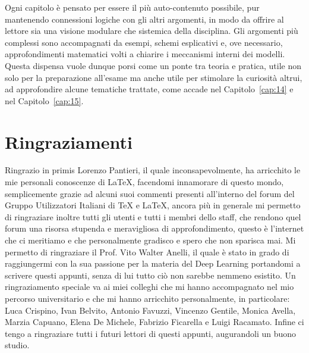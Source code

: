 Ogni capitolo è pensato per essere il più auto-contenuto possibile, pur mantenendo connessioni logiche con gli altri argomenti, in modo da offrire al lettore sia una visione modulare che sistemica della disciplina. Gli argomenti più complessi sono accompagnati da esempi, schemi esplicativi e, ove necessario, approfondimenti matematici volti a chiarire i meccanismi interni dei modelli. Questa dispensa vuole dunque porsi come un ponte tra teoria e pratica, utile non solo per la preparazione all’esame ma anche utile per stimolare la curiosità altrui, ad approfondire alcune tematiche trattate, come accade nel Capitolo~\ref{cap:14} e nel Capitolo~\ref{cap:15}.


\chapter*{Ringraziamenti}

Ringrazio in primis Lorenzo Pantieri, il quale inconsapevolmente, ha arricchito le mie personali conoscenze di \LaTeX, facendomi innamorare di questo mondo, semplicemente grazie ad alcuni suoi commenti presenti all'interno del forum del Gruppo Utilizzatori Italiani di \TeX{} e \LaTeX, ancora più in generale mi permetto di ringraziare inoltre tutti gli utenti e tutti i membri dello staff, che rendono quel forum una risorsa stupenda e meravigliosa di approfondimento, questo è l'internet che ci meritiamo e che personalmente gradisco e spero che non sparisca mai. Mi permetto di ringraziare il Prof. Vito Walter Anelli, il quale è stato in grado di raggiungermi con la sua passione per la materia del Deep Learning portandomi a scrivere questi appunti, senza di lui tutto ciò non sarebbe nemmeno esistito. Un ringraziamento speciale va ai miei colleghi che mi hanno accompagnato nel mio percorso universitario e che mi hanno arricchito personalmente, in particolare: Luca Crispino, Ivan Belvito, Antonio Favuzzi, Vincenzo Gentile, Monica Avella, Marzia Capuano, Elena De Michele, Fabrizio Ficarella e Luigi Racamato. Infine ci tengo a ringraziare tutti i futuri lettori di questi appunti, augurandoli un buono studio.
